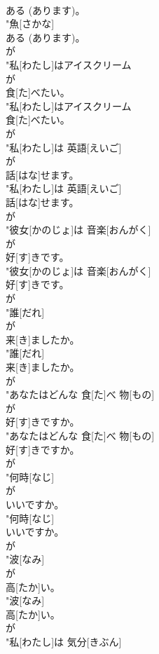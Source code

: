 \documentclass[8pt]{extreport}
\begin{document}
\begin{CJK}{UTF8}{min}
\\	ある (あります)。
\\	"魚[さかな]
\\	ある (あります)。
\\	が
\\	"私[わたし]はアイスクリーム
\\	が
\\	食[た]べたい。
\\	"私[わたし]はアイスクリーム
\\	食[た]べたい。
\\	が
\\	"私[わたし]は 英語[えいご]
\\	が
\\	話[はな]せます。
\\	"私[わたし]は 英語[えいご]
\\	話[はな]せます。
\\	が
\\	"彼女[かのじょ]は 音楽[おんがく]
\\	が
\\	好[す]きです。
\\	"彼女[かのじょ]は 音楽[おんがく]
\\	好[す]きです。
\\	が
\\	"誰[だれ]
\\	が
\\	来[き]ましたか。
\\	"誰[だれ]
\\	来[き]ましたか。
\\	が
\\	"あなたはどんな 食[た]べ 物[もの]
\\	が
\\	好[す]きですか。
\\	"あなたはどんな 食[た]べ 物[もの]
\\	好[す]きですか。
\\	が
\\	"何時[なじ]
\\	が
\\	いいですか。
\\	"何時[なじ]
\\	いいですか。
\\	が
\\	"波[なみ]
\\	が
\\	高[たか]い。
\\	"波[なみ]
\\	高[たか]い。
\\	が
\\	"私[わたし]は 気分[きぶん]

\end{CJK}
\end{document}
